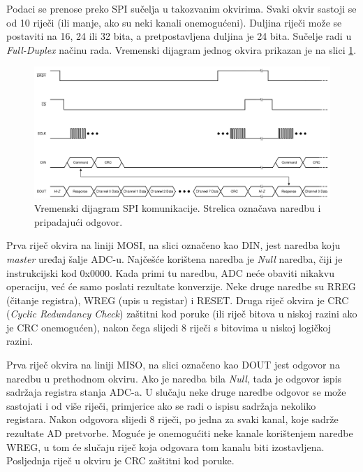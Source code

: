            Podaci se prenose preko SPI sučelja u takozvanim okvirima. Svaki okvir sastoji se od 10 riječi (ili manje, ako su neki kanali onemogućeni). Duljina riječi može se postaviti na 16, 24 ili 32 bita, a pretpostavljena duljina je 24 bita. Sučelje radi u \textit{Full-Duplex} načinu rada. Vremenski dijagram jednog okvira prikazan je na slici \ref{fig:ads131m08_spi_vremenski_dijagram}.

            \begin{figure}[htb]
                \centering
                \includegraphics[width=\textwidth]{slike/ads131m08_spi_vremenski_dijagram.png}
                \caption{Vremenski dijagram SPI komunikacije. Strelica označava naredbu i pripadajući odgovor. \cite{ads131m08_datasheet}}
                \label{fig:ads131m08_spi_vremenski_dijagram}
            \end{figure}

            Prva riječ okvira na liniji MOSI, na slici označeno kao DIN, jest naredba koju \textit{master} uređaj šalje ADC-u. Najčešće korištena naredba je \textit{Null} naredba, čiji je instrukcijski kod 0x0000. Kada primi tu naredbu, ADC neće obaviti nikakvu operaciju, već će samo poslati rezultate konverzije. Neke druge naredbe su RREG (čitanje registra), WREG (upis u registar) i RESET. Druga riječ okvira je CRC (\textit{Cyclic Redundancy Check}) zaštitni kod poruke (ili riječ bitova u niskoj razini ako je CRC onemogućen), nakon čega slijedi 8 riječi s bitovima u niskoj logičkoj razini.

            Prva riječ okvira na liniji MISO, na slici označeno kao DOUT jest odgovor na naredbu u prethodnom okviru. Ako je naredba bila \textit{Null}, tada je odgovor ispis sadržaja registra stanja ADC-a. U slučaju neke druge naredbe odgovor se može sastojati i od više riječi, primjerice ako se radi o ispisu sadržaja nekoliko registara. Nakon odgovora slijedi 8 riječi, po jedna za svaki kanal, koje sadrže rezultate AD pretvorbe. Moguće je onemogućiti neke kanale korištenjem naredbe WREG, u tom će slučaju riječ koja odgovara tom kanalu biti izostavljena. Posljednja riječ u okviru je CRC zaštitni kod poruke.
            

